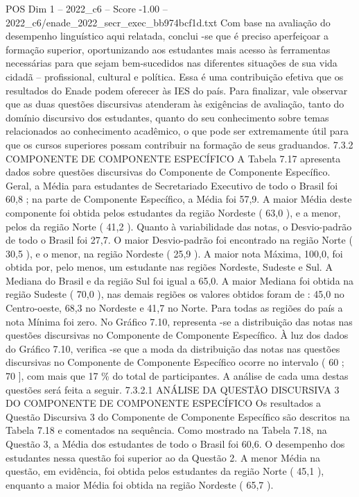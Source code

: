\begin{textsample}{POS Dim 1 – 2022\_c6 – Score -1.00 – 2022\_c6/enade\_2022\_secr\_exec\_bb974bcf1d.txt}
Com base na avaliação do desempenho linguístico aqui relatada, conclui -se que é preciso aperfeiçoar a formação superior, oportunizando aos estudantes mais acesso às ferramentas necessárias para que sejam bem-sucedidos nas diferentes situações de sua vida cidadã – profissional, cultural e política.
Essa é uma contribuição efetiva que os resultados do Enade podem oferecer às IES do país.
Para finalizar, vale observar que as duas questões discursivas atenderam às exigências de avaliação, tanto do domínio discursivo dos estudantes, quanto do seu conhecimento sobre temas relacionados ao conhecimento acadêmico, o que pode ser extremamente útil para que os cursos superiores possam contribuir na formação de seus graduandos. 7.3.2 COMPONENTE DE COMPONENTE ESPECÍFICO A Tabela 7.17 apresenta dados sobre questões discursivas do Componente de Componente Específico.
Geral, a Média para estudantes de Secretariado Executivo de todo o Brasil foi 60,8 ; na parte de Componente Específico, a Média foi 57,9.
A maior Média deste componente foi obtida pelos estudantes da região Nordeste ( 63,0 ), e a menor, pelos da região Norte ( 41,2 ).
Quanto à variabilidade das notas, o Desvio-padrão de todo o Brasil foi 27,7.
O maior Desvio-padrão foi encontrado na região Norte ( 30,5 ), e o menor, na região Nordeste ( 25,9 ).
A maior nota Máxima, 100,0, foi obtida por, pelo menos, um estudante nas regiões Nordeste, Sudeste e Sul.
A Mediana do Brasil e da região Sul foi igual a 65,0.
A maior Mediana foi obtida na região Sudeste ( 70,0 ), nas demais regiões os valores obtidos foram de : 45,0 no Centro-oeste, 68,3 no Nordeste e 41,7 no Norte.
Para todas as regiões do país a nota Mínima foi zero.
No Gráfico 7.10, representa -se a distribuição das notas nas questões discursivas no Componente de Componente Específico.
À luz dos dados do Gráfico 7.10, verifica -se que a moda da distribuição das notas nas questões discursivas no Componente de Componente Específico ocorre no intervalo ( 60 ; 70 ], com mais que 17 \% do total de participantes.
A análise de cada uma destas questões será feita a seguir. 7.3.2.1 ANÁLISE DA QUESTÃO DISCURSIVA 3 DO COMPONENTE DE COMPONENTE ESPECÍFICO Os resultados a Questão Discursiva 3 do Componente de Componente Específico são descritos na Tabela 7.18 e comentados na sequência.
Como mostrado na Tabela 7.18, na Questão 3, a Média dos estudantes de todo o Brasil foi 60,6.
O desempenho dos estudantes nessa questão foi superior ao da Questão 2.
A menor Média na questão, em evidência, foi obtida pelos estudantes da região Norte ( 45,1 ), enquanto a maior Média foi obtida na região Nordeste ( 65,7 ).

\end{textsample}
